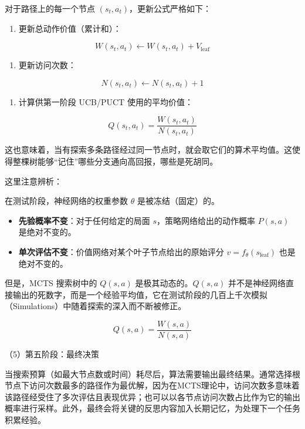 对于路径上的每一个节点 \((s_t,a_t)\)，更新公式严格如下：

\begin{enumerate}
\def\labelenumi{\arabic{enumi}.}
\tightlist
\item
  更新总动作价值（累计和）：
\end{enumerate}

\[
W(s_t,a_t)\leftarrow W(s_t,a_t)+V_{\mathrm{leaf}}
\]

\begin{enumerate}
\def\labelenumi{\arabic{enumi}.}
\setcounter{enumi}{1}
\tightlist
\item
  更新访问次数：
\end{enumerate}

\[
N(s_t,a_t)\leftarrow N(s_t,a_t)+1
\]

\begin{enumerate}
\def\labelenumi{\arabic{enumi}.}
\setcounter{enumi}{2}
\tightlist
\item
  计算供第一阶段 UCB/PUCT 使用的平均价值：
\end{enumerate}

\[
Q(s_t,a_t)=\frac{W(s_t,a_t)}{N(s_t,a_t)}
\]

这也意味着，当有探索多条路径经过同一节点时，就会取它们的算术平均值。这使得整棵树能够``记住''哪些分支通向高回报，哪些是死胡同。

这里注意辨析：

在测试阶段，神经网络的权重参数 \(\theta\) 是被冻结（固定）的。

\begin{itemize}
\tightlist
\item
  \textbf{先验概率不变}：对于任何给定的局面 \(s\)，策略网络给出的动作概率 \(P(s,a)\) 是绝对不变的。
\item
  \textbf{单次评估不变}：价值网络对某个叶子节点给出的原始评分 \(v=f_\theta(s_{\mathrm{leaf}})\) 也是绝对不变的。
\end{itemize}

但是，MCTS 搜索树中的 \(Q(s,a)\) 是极其动态的。\(Q(s,a)\) 并不是神经网络直接输出的死数字，而是一个经验平均值，它在测试阶段的几百上千次模拟（Simulations）中随着探索的深入而不断被修正。

\[
Q(s,a)=\frac{W(s,a)}{N(s,a)}
\]

（5）第五阶段：最终决策

当搜索预算（如最大节点数或时间）耗尽后，算法需要输出最终结果。通常选择根节点下访问次数最多的路径作为最优解，因为在MCTS理论中，访问次数多意味着该路径经受住了多次评估且表现优异；也可以以各节点访问次数占比作为它的输出概率进行采样。此外，最终会将关键的反思内容加入长期记忆，为处理下一个任务积累经验。

